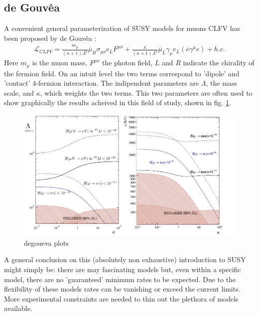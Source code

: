 \documentclass[12pt,a4paper,openright, oneside, titlepage]{book} %
\begin{document}
\subsection{de Gouv\^{e}a}
A convenient general parameterization of SUSY models for muons CLFV  has been proposed by de Gouv\^{e}a \cite{deGouvea}:
\begin{align}
\mathcal{L}_{CLFV}=
\frac{m_\mu}{(\kappa+1)\Lambda^2}\overline{\mu}_R\sigma_{\mu\nu}e_LF^{\mu\nu}+
\frac{\kappa}{(\kappa+1)\Lambda^2}\overline{\mu}_L\gamma_\mu e_L (\overline{e}\gamma^\mu e)+h.c.
\label{eq_deGouvea}
\end{align}
Here $m_\mu$ is the muon mass, $F^{\mu\nu}$ the photon field, $L$ and $R$ indicate the chirality of the fermion field.
On an intuit level the two terms correspond to 'dipole' and 'contact' 4-fermion interaction.
The indipendent parameters are $\Lambda$, the mass scale, and $\kappa$, which weights the two terms. This two parameters are often used to show graphically the results acheived in this field of study, shown in fig. \ref{_deGouvea}.

\begin{figure}[h!]
\includegraphics[scale=0.8]{deGouvea}
\caption{degoueva plots}
\label{_deGouvea}
\end{figure}


\noindent A general conclusion on this (absolutely non exhaustive) introduction to SUSY might simply be: there are may fascinating models but, even within a specific model, there are no 'guaranteed' minimum rates to be expected. Due to the flexibility of these models rates can be vanishing or exceed the current limits.
More experimental constraints are needed to thin out the plethora of models available.
\end{document}
